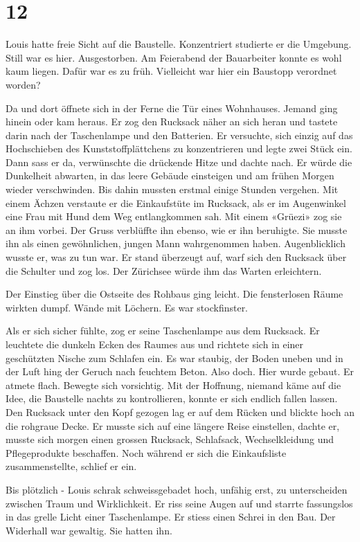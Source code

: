 \chapter{12}



Louis hatte freie Sicht auf die Baustelle. Konzentriert studierte er die 
Umgebung. Still war es hier. Ausgestorben. Am Feierabend der
Bauarbeiter konnte es wohl kaum liegen. Dafür war es zu früh. Vielleicht
war hier ein Baustopp verordnet worden?

Da und dort öffnete sich in der Ferne die Tür eines Wohnhauses. Jemand 
ging hinein oder kam heraus.
Er zog den Rucksack näher an sich heran und tastete darin nach
der Taschenlampe und den Batterien. Er versuchte, sich
einzig auf das Hochschieben des Kunststoffplättchens zu konzentrieren
und legte zwei Stück ein. Dann sass er da, verwünschte die drückende Hitze und dachte nach. Er würde die Dunkelheit abwarten, in das leere Gebäude einsteigen und am frühen Morgen wieder verschwinden. Bis dahin mussten erstmal einige Stunden vergehen. 
Mit einem Ächzen verstaute er die Einkaufstüte im Rucksack, als er im Augenwinkel eine Frau mit Hund dem Weg entlangkommen sah.
Mit einem «Grüezi» zog sie an ihm vorbei. Der Gruss verblüffte ihn ebenso, wie er ihn beruhigte. 
Sie musste ihn als einen gewöhnlichen, jungen Mann wahrgenommen haben. Augenblicklich wusste er, was zu tun war. 
Er stand überzeugt auf, warf sich den Rucksack über die Schulter und zog los. Der Zürichsee würde ihm das Warten erleichtern.  

\sectionbreak

Der Einstieg über die Ostseite des Rohbaus ging leicht. Die 
fensterlosen Räume wirkten dumpf. Wände mit Löchern. Es war
stockfinster.

Als er sich sicher fühlte, zog er seine Taschenlampe aus dem
Rucksack. Er leuchtete die dunkeln Ecken des Raumes aus und richtete
sich in einer geschützten Nische zum Schlafen ein. Es war staubig, der
Boden uneben und in der Luft hing der Geruch nach feuchtem Beton. Also
doch. Hier wurde gebaut.
Er atmete flach. Bewegte sich vorsichtig. Mit der Hoffnung, niemand
käme auf die Idee, die Baustelle nachts zu kontrollieren, konnte er sich
endlich fallen lassen. Den Rucksack unter den Kopf gezogen lag er auf dem Rücken und blickte hoch an die rohgraue Decke. Er musste sich auf eine längere Reise einstellen, dachte er, musste sich morgen einen grossen Rucksack, Schlafsack, Wechselkleidung und Pflegeprodukte beschaffen. Noch während er sich die Einkaufsliste zusammenstellte, schlief er ein.

\sectionbreak

Bis plötzlich - Louis schrak schweissgebadet hoch, unfähig erst, zu
unterscheiden zwischen Traum und Wirklichkeit. Er riss seine Augen auf
und starrte fassungslos in das grelle Licht einer Taschenlampe. Er
stiess einen Schrei in den Bau. Der Widerhall war gewaltig.
Sie hatten ihn.
